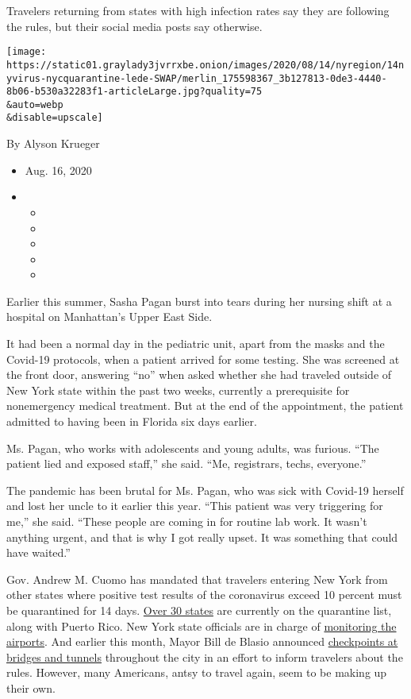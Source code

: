 Travelers returning from states with high infection rates say they are
following the rules, but their social media posts say otherwise.

\texttt{[image: https://static01.graylady3jvrrxbe.onion/images/2020/08/14/nyregion/14nyvirus-nycquarantine-lede-SWAP/merlin\_175598367\_3b127813-0de3-4440-8b06-b530a32283f1-articleLarge.jpg?quality=75\\\&auto=webp\\\&disable=upscale]}

By Alyson Krueger

\begin{itemize}
\item
  Aug. 16, 2020
\item
  \begin{itemize}
  \item
  \item
  \item
  \item
  \item
  \end{itemize}
\end{itemize}

Earlier this summer, Sasha Pagan burst into tears during her nursing
shift at a hospital on Manhattan's Upper East Side.

It had been a normal day in the pediatric unit, apart from the masks and
the Covid-19 protocols, when a patient arrived for some testing. She was
screened at the front door, answering ``no'' when asked whether she had
traveled outside of New York state within the past two weeks, currently
a prerequisite for nonemergency medical treatment. But at the end of the
appointment, the patient admitted to having been in Florida six days
earlier.

Ms. Pagan, who works with adolescents and young adults, was furious.
``The patient lied and exposed staff,'' she said. ``Me, registrars,
techs, everyone.''

The pandemic has been brutal for Ms. Pagan, who was sick with Covid-19
herself and lost her uncle to it earlier this year. ``This patient was
very triggering for me,'' she said. ``These people are coming in for
routine lab work. It wasn't anything urgent, and that is why I got
really upset. It was something that could have waited.''

Gov. Andrew M. Cuomo has mandated that travelers entering New York from
other states where positive test results of the coronavirus exceed 10
percent must be quarantined for 14 days.
\href{https://coronavirus.health.ny.gov/covid-19-travel-advisory?gclid=EAIaIQobChMIoZW6tJyR6wIVSeG1Ch1VkgGJEAAYASAAEgKV1PD_BwE}{Over
30 states} are currently on the quarantine list, along with Puerto Rico.
New York state officials are in charge of
\href{https://coronavirus.health.ny.gov/covid-19-travel-advisory}{monitoring
the airports}. And earlier this month, Mayor Bill de Blasio announced
\href{https://www.nytimes3xbfgragh.onion/2020/08/05/nyregion/nyc-coronavirus-quarantine-checkpoints.html}{checkpoints
at bridges and tunnels} throughout the city in an effort to inform
travelers about the rules. However, many Americans, antsy to travel
again, seem to be making up their own.

